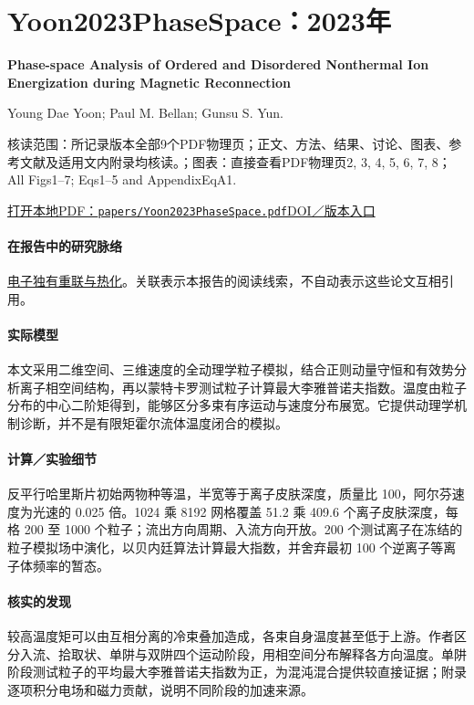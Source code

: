 \section{Yoon2023PhaseSpace：2023年}\label{paper:Yoon2023PhaseSpace}

\textbf{Phase-space Analysis of Ordered and Disordered Nonthermal Ion Energization during Magnetic Reconnection}\citep{Yoon2023PhaseSpace}\

Young Dae Yoon;  Paul M. Bellan;  Gunsu S. Yun.

\textsf{核读范围：}所记录版本全部9个PDF物理页；正文、方法、结果、讨论、图表、参考文献及适用文内附录均核读。；\textsf{图表：}直接查看PDF物理页2, 3, 4, 5, 6, 7, 8；All Figs1–7;  Eqs1–5 and AppendixEqA1.

\href{run:papers/Yoon2023PhaseSpace.pdf}{打开本地PDF：\texttt{papers/Yoon2023PhaseSpace.pdf}}\quad\href{https://doi.org/10.3847/1538-4357/acf1f5}{DOI／版本入口}

\paragraph{在报告中的研究脉络}\hyperref[story:energy]{电子独有重联与热化}。关联表示本报告的阅读线索，不自动表示这些论文互相引用。

\paragraph{实际模型}本文采用二维空间、三维速度的全动理学粒子模拟，结合正则动量守恒和有效势分析离子相空间结构，再以蒙特卡罗测试粒子计算最大李雅普诺夫指数。温度由粒子分布的中心二阶矩得到，能够区分多束有序运动与速度分布展宽。它提供动理学机制诊断，并不是有限矩霍尔流体温度闭合的模拟。

\paragraph{计算／实验细节}反平行哈里斯片初始两物种等温，半宽等于离子皮肤深度，质量比 100，阿尔芬速度为光速的 0.025 倍。1024 乘 8192 网格覆盖 51.2 乘 409.6 个离子皮肤深度，每格 200 至 1000 个粒子；流出方向周期、入流方向开放。200 个测试离子在冻结的粒子模拟场中演化，以贝内廷算法计算最大指数，并舍弃最初 100 个逆离子等离子体频率的暂态。

\paragraph{核实的发现}较高温度矩可以由互相分离的冷束叠加造成，各束自身温度甚至低于上游。作者区分入流、拾取状、单阱与双阱四个运动阶段，用相空间分布解释各方向温度。单阱阶段测试粒子的平均最大李雅普诺夫指数为正，为混沌混合提供较直接证据；附录逐项积分电场和磁力贡献，说明不同阶段的加速来源。

